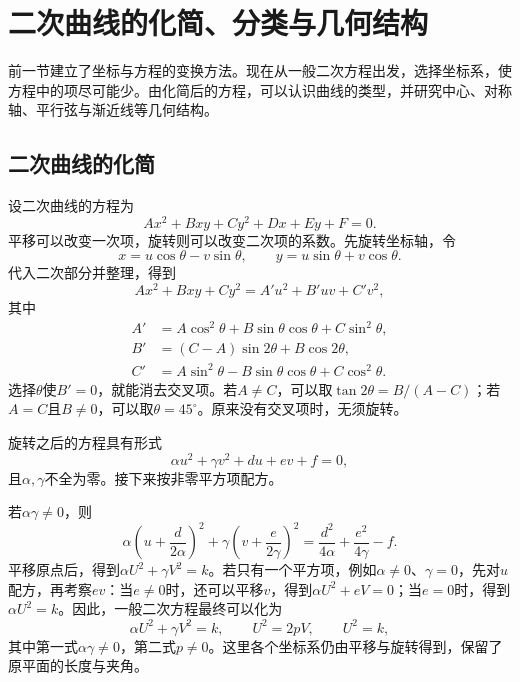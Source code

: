 ﻿\newpage
\section{二次曲线的化简、分类与几何结构}
\label{sec:quadratic-reduction-and-classification}

前一节建立了坐标与方程的变换方法。现在从一般二次方程出发，选择坐标系，使方程中的项尽可能少。由化简后的方程，可以认识曲线的类型，并研究中心、对称轴、平行弦与渐近线等几何结构。

\subsection{二次曲线的化简}
\label{subsec:quadratic-reduction}

设二次曲线的方程为
\begin{equation}\label{eq:quadratic-reduction-general}
    Ax^2+Bxy+Cy^2+Dx+Ey+F=0 .
\end{equation}
平移可以改变一次项，旋转则可以改变二次项的系数。先旋转坐标轴，令
\begin{equation*}
    x=u\cos\theta-v\sin\theta , \qquad
    y=u\sin\theta+v\cos\theta .
\end{equation*}
代入二次部分并整理，得到
\begin{equation*}
    Ax^2+Bxy+Cy^2=A'u^2+B'uv+C'v^2 ,
\end{equation*}
其中
\begin{equation}\label{eq:quadratic-rotated-coefficients}
    \begin{aligned}
        A'&=A\cos^2\theta+B\sin\theta\cos\theta+C\sin^2\theta ,\\
        B'&=(C-A)\sin2\theta+B\cos2\theta ,\\
        C'&=A\sin^2\theta-B\sin\theta\cos\theta+C\cos^2\theta .
    \end{aligned}
\end{equation}
选择\(\theta\)使\(B'=0\)，就能消去交叉项。若\(A\ne C\)，可以取\(\tan2\theta=B/(A-C)\)；若\(A=C\)且\(B\ne0\)，可以取\(\theta=45^\circ\)。原来没有交叉项时，无须旋转。

旋转之后的方程具有形式
\begin{equation}\label{eq:quadratic-diagonal-equation}
    \alpha u^2+\gamma v^2+du+ev+f=0 ,
\end{equation}
且\(\alpha,\gamma\)不全为零。接下来按非零平方项配方。

若\(\alpha\gamma\ne0\)，则
\begin{equation*}
    \alpha\left(u+\frac d{2\alpha}\right)^2
    +\gamma\left(v+\frac e{2\gamma}\right)^2
    =\frac{d^2}{4\alpha}+\frac{e^2}{4\gamma}-f .
\end{equation*}
平移原点后，得到\(\alpha U^2+\gamma V^2=k\)。若只有一个平方项，例如\(\alpha\ne0\)、\(\gamma=0\)，先对\(u\)配方，再考察\(ev\)：当\(e\ne0\)时，还可以平移\(v\)，得到\(\alpha U^2+eV=0\)；当\(e=0\)时，得到\(\alpha U^2=k\)。因此，一般二次方程最终可以化为
\begin{equation}\label{eq:quadratic-reduced-three-types}
    \alpha U^2+\gamma V^2=k , \qquad
    U^2=2pV , \qquad U^2=k ,
\end{equation}
其中第一式\(\alpha\gamma\ne0\)，第二式\(p\ne0\)。这里各个坐标系仍由平移与旋转得到，保留了原平面的长度与夹角。

